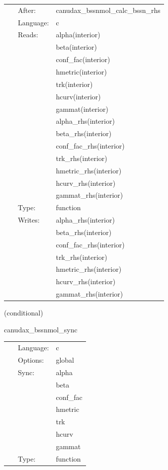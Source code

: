  \begin{tabular*}{160mm}{cll} 
~ & After:  & canudax\_bssnmol\_calc\_bssn\_rhs \\ 
~ & Language:  & c \\ 
~ & Reads:  & alpha(interior) \\ 
~& ~ &beta(interior)\\ 
~& ~ &conf\_fac(interior)\\ 
~& ~ &hmetric(interior)\\ 
~& ~ &trk(interior)\\ 
~& ~ &hcurv(interior)\\ 
~& ~ &gammat(interior)\\ 
~& ~ &alpha\_rhs(interior)\\ 
~& ~ &beta\_rhs(interior)\\ 
~& ~ &conf\_fac\_rhs(interior)\\ 
~& ~ &trk\_rhs(interior)\\ 
~& ~ &hmetric\_rhs(interior)\\ 
~& ~ &hcurv\_rhs(interior)\\ 
~& ~ &gammat\_rhs(interior)\\ 
~ & Type:  & function \\ 
~ & Writes:  & alpha\_rhs(interior) \\ 
~& ~ &beta\_rhs(interior)\\ 
~& ~ &conf\_fac\_rhs(interior)\\ 
~& ~ &trk\_rhs(interior)\\ 
~& ~ &hmetric\_rhs(interior)\\ 
~& ~ &hcurv\_rhs(interior)\\ 
~& ~ &gammat\_rhs(interior)\\ 
\end{tabular*} 


\vspace{5mm}

   (conditional) 

\hspace{5mm} canudax\_bssnmol\_sync 

\hspace{5mm}{\it sync state vector } 


\hspace{5mm}

 \begin{tabular*}{160mm}{cll} 
~ & Language:  & c \\ 
~ & Options:  & global \\ 
~ & Sync:  & alpha \\ 
~& ~ &beta\\ 
~& ~ &conf\_fac\\ 
~& ~ &hmetric\\ 
~& ~ &trk\\ 
~& ~ &hcurv\\ 
~& ~ &gammat\\ 
~ & Type:  & function \\ 
\end{tabular*} 


